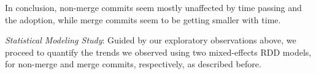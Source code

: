 In conclusion, non-merge commits seem mostly unaffected by time passing and 
the \Tvis adoption, while merge commits seem to be getting smaller with time.




%



\smallskip\noindent \emph{Statistical Modeling Study}: 
Guided by our exploratory observations above, we proceed to quantify the 
trends we observed using two mixed-effects RDD models, for non-merge 
and merge commits, respectively, as described before.

